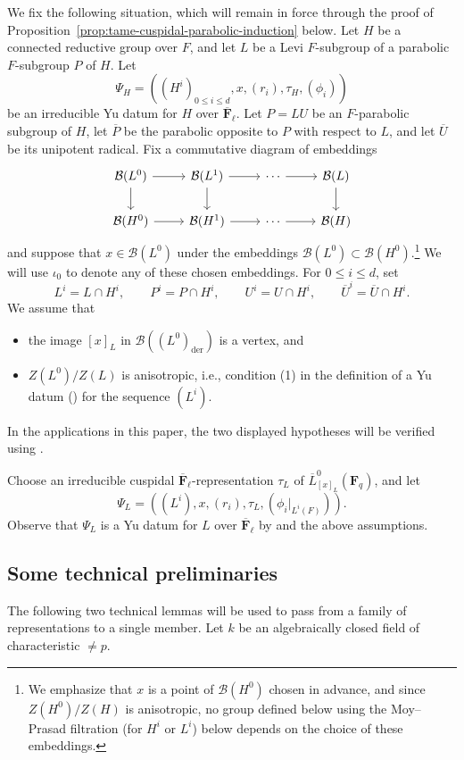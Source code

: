 \documentclass[reqno]{amsart}
\numberwithin{equation}{subsection}
\newcommand{\F}{\mathbf{F}}
\newcommand{\ol}[1]{\overline{#1}}
\newcommand\cB{\mathcal{B}}
\DeclareMathOperator{\der}{der}
\theoremstyle{remark}
\numberwithin{equation}{subsection}
\numberwithin{figure}{subsection}
\begin{document}
We fix the following situation, which will remain in force through the proof of Proposition~\ref{prop:tame-cuspidal-parabolic-induction} below. Let $H$ be a connected reductive group over $F$, and let $L$ be a Levi $F$-subgroup of a parabolic $F$-subgroup $P$ of $H$. Let
\[
\Psi_H = ((H^i)_{0 \leq i \leq d}, x, (r_i), \tau_H, (\phi_i))
\]
be an irreducible Yu datum for $H$ over $\ol\F_\ell$. Let $P = LU$ be an $F$-parabolic subgroup of $H$, let $\ol P$ be the parabolic opposite to $P$ with respect to $L$, and let $\ol U$ be its unipotent radical. Fix a commutative diagram of embeddings
\[
\begin{tikzcd}
\cB(L^0) \arrow[r] \arrow[d]
&\cB(L^1) \arrow[r] \arrow[d]
&\cdots \arrow[r]
&\cB(L) \arrow[d] \\
\cB(H^0) \arrow[r]
&\cB(H^1) \arrow[r]
&\cdots \arrow[r]
&\cB(H)
\end{tikzcd}
\]
and suppose that $x \in \cB(L^0)$ under the embeddings $\cB(L^0) \subset \cB(H^0)$.\footnote{We emphasize that $x$ is a point of $\cB(H^0)$ chosen in advance, and since $Z(H^0)/Z(H)$ is anisotropic, no group defined below using the Moy--Prasad filtration (for $H^i$ or $L^i$) below depends on the choice of these embeddings.} We will use $\iota_0$ to denote any of these chosen embeddings. For $0 \leq i \leq d$, set
\[
L^i = L \cap H^i, \qquad P^i = P \cap H^i, \qquad U^i = U \cap H^i, \qquad \ol U^i = \ol U \cap H^i.
\]
We assume that  
\begin{itemize}
\item the image $[x]_L$ in $\cB((L^0)_{\der})$ is a vertex, and
\item $Z(L^0)/Z(L)$ is anisotropic, i.e., condition (1) in the definition of a Yu datum (\cite[\S 6.1]{CF26a}) for the sequence $(L^i)$. 
\end{itemize}
In the applications in this paper, the two displayed hypotheses will be verified using \cite[Lemmas~9.1.2 and 9.1.1]{CF26a}.



Choose an irreducible cuspidal $\ol\F_\ell$-representation $\tau_L$ of $\ol L^0_{[x]_L}(\F_q)$, and let
\[
\Psi_L = ((L^i), x, (r_i), \tau_L, (\phi_i|_{L^i(F)})).
\]
Observe that $\Psi_L$ is a Yu datum for $L$ over $\ol\F_\ell$ by \cite[Lemma~9.3.1]{CF26a} and the above assumptions.



\subsection{Some technical preliminaries}
The following two technical lemmas will be used to pass from a family of representations to a single member. Let $k$ be an algebraically closed field of characteristic $\neq p$.
\end{document}
